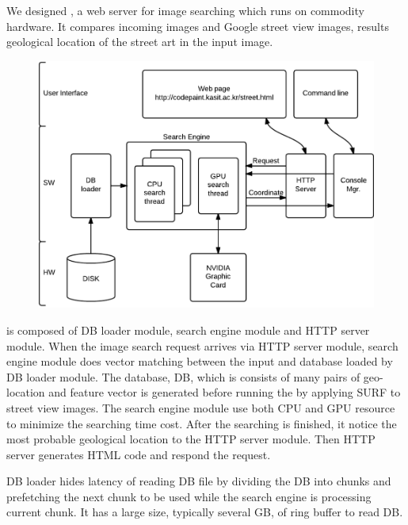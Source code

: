 
We designed \name{}, a web server for image searching which runs on commodity hardware.
It compares incoming images and Google street view images, results geological location of the street art in the input image.


\begin{figure}[t]
	\centering
	\includegraphics[scale=0.50]{figs/arch}
	\vspace{-0.1in}
	\vspace{-0.1in}
	\label{fig:arch}
\end{figure}

\name{} is composed of DB loader module, search engine module and HTTP server module.
When the image search request arrives via HTTP server module, search engine module does vector matching between the input and database loaded by DB loader module.
The database, DB, which is consists of many pairs of geo-location and feature vector is generated before running the \name{} by applying SURF to street view images.
The search engine module use both CPU and GPU resource to minimize the searching time cost.
After the searching is finished, it notice the most probable geological location to the HTTP server module.
Then HTTP server generates HTML code and respond the request.

DB loader hides latency of reading DB file by dividing the DB into chunks and prefetching the next chunk to be used while the search engine is processing current chunk.
It has a large size, typically several GB, of ring buffer to read DB.


